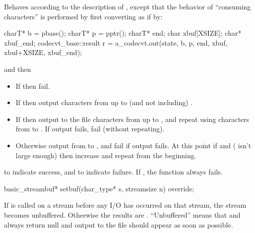 \begin{itemdescr}
\pnum
\effects
Behaves according to the description of
,
except that the behavior of ``consuming characters'' is performed by first
converting as if by:

\begin{codeblock}
charT* b = pbase();
charT* p = pptr();
charT* end;
char   xbuf[XSIZE];
char*  xbuf_end;
codecvt_base::result r =
  a_codecvt.out(state, b, p, end, xbuf, xbuf+XSIZE, xbuf_end);
\end{codeblock}

and then
\begin{itemize}
\item If  then fail.
\item If  then output characters from
 up to (and not including) .
\item If  then output to the file characters from
 up to , and repeat using characters from
 to . If output fails, fail (without repeating).
\item Otherwise output from  to , and fail if output fails.
At this point if  and  ( isn't large
enough) then increase  and repeat from the beginning.
\end{itemize}

\pnum
\returns
{}
to indicate success, and
to indicate failure.
If
,
the function always fails.
\end{itemdescr}

%
\begin{itemdecl}
basic_streambuf* setbuf(char_type* s, streamsize n) override;
\end{itemdecl}

\begin{itemdescr}
\pnum
\effects
If
is called on a stream before any I/O has occurred on that stream, the
stream becomes unbuffered.
Otherwise the results are .
``Unbuffered'' means that
and
always return null
and output to the file should appear as soon as possible.
\end{itemdescr}

